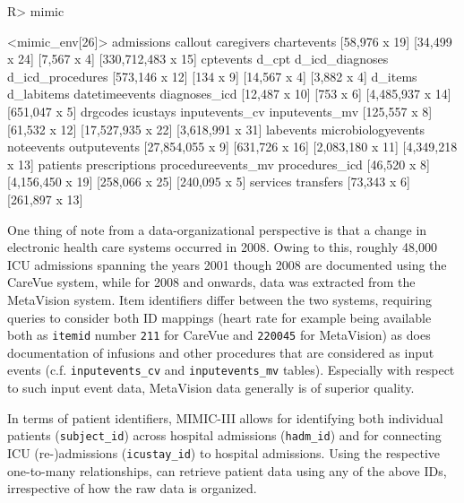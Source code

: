 \documentclass[
  notitle]{jss}
\begin{document}
\begin{CodeChunk}
\begin{CodeInput}
R> mimic
\end{CodeInput}
\begin{CodeOutput}
<mimic_env[26]>
        admissions            callout         caregivers        chartevents 
     [58,976 x 19]      [34,499 x 24]        [7,567 x 4] [330,712,483 x 15] 
         cptevents              d_cpt    d_icd_diagnoses   d_icd_procedures 
    [573,146 x 12]          [134 x 9]       [14,567 x 4]        [3,882 x 4] 
           d_items         d_labitems     datetimeevents      diagnoses_icd 
     [12,487 x 10]          [753 x 6]   [4,485,937 x 14]      [651,047 x 5] 
          drgcodes           icustays     inputevents_cv     inputevents_mv 
     [125,557 x 8]      [61,532 x 12]  [17,527,935 x 22]   [3,618,991 x 31] 
         labevents microbiologyevents         noteevents       outputevents 
  [27,854,055 x 9]     [631,726 x 16]   [2,083,180 x 11]   [4,349,218 x 13] 
          patients      prescriptions procedureevents_mv     procedures_icd 
      [46,520 x 8]   [4,156,450 x 19]     [258,066 x 25]      [240,095 x 5] 
          services          transfers 
      [73,343 x 6]     [261,897 x 13] 
\end{CodeOutput}
\end{CodeChunk}

One thing of note from a data-organizational perspective is that a
change in electronic health care systems occurred in 2008. Owing to
this, roughly 48,000 ICU admissions spanning the years 2001 though 2008
are documented using the CareVue system, while for 2008 and onwards,
data was extracted from the MetaVision system. Item identifiers differ
between the two systems, requiring queries to consider both ID mappings
(heart rate for example being available both as \texttt{itemid} number
\texttt{211} for CareVue and \texttt{220045} for MetaVision) as does
documentation of infusions and other procedures that are considered as
input events (c.f. \texttt{inputevents\_cv} and \texttt{inputevents\_mv}
tables). Especially with respect to such input event data, MetaVision
data generally is of superior quality.

In terms of patient identifiers, MIMIC-III allows for identifying both
individual patients (\texttt{subject\_id}) across hospital admissions
(\texttt{hadm\_id}) and for connecting ICU (re-)admissions
(\texttt{icustay\_id}) to hospital admissions. Using the respective
one-to-many relationships,  can retrieve patient data using
any of the above IDs, irrespective of how the raw data is organized.
\end{document}
